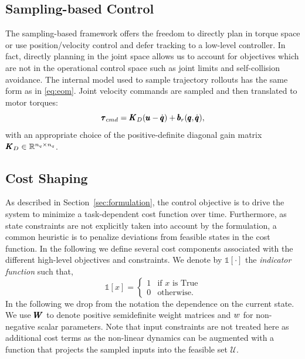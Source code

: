 \subsection{Sampling-based Control}
The sampling-based framework offers the freedom to directly plan in torque space or use position/velocity control and defer tracking to a low-level controller. In fact, directly planning in the joint space allows us to account for objectives which are not in the operational control space such as joint limits and self-collision avoidance. The internal model used to sample trajectory rollouts has the same form as in \eqref{eq:eom}. Joint velocity commands are sampled and then translated to motor torques:
\begin{equation} \label{eq:cmd_sim}
    \pmb{\tau}_{cmd} = \pmb{K}_{D} (\pmb{u} - \dot{\pmb{q}}) + \pmb{b}_{r}(\pmb{q}, \dot{\pmb{q}}),
\end{equation}
with an appropriate choice of the positive-definite diagonal gain matrix $\pmb{K}_{D} \in \mathbb{R}^{n_q\times n_q}$. 

\subsection{Cost Shaping}
As described in Section~\ref{sec:formulation}, the control objective is to drive the system to minimize a task-dependent cost function over time. Furthermore, as state constraints are not explicitly taken into account by the formulation, a common heuristic is to penalize deviations from feasible states in the cost function. In the following we define several cost components associated with the different high-level objectives and constraints.
We denote by $\mathds{1}[\cdot]$ the \textit{indicator function} such that,
\begin{equation}
    \mathds{1}[x] = 
    \begin{cases}
    1 & \text{if } x \text{ is True} \\
    0 & \text{otherwise}.
    \end{cases}
\end{equation}
In the following we drop from the notation the dependence on the current state. We use $\pmb{W}_{}$ to denote positive semidefinite weight matrices and $w_{}$ for non-negative scalar parameters. Note that input constraints are not treated here as additional cost terms as the non-linear dynamics can be augmented with a function that projects the sampled inputs into the feasible set $\mathcal{U}$.

